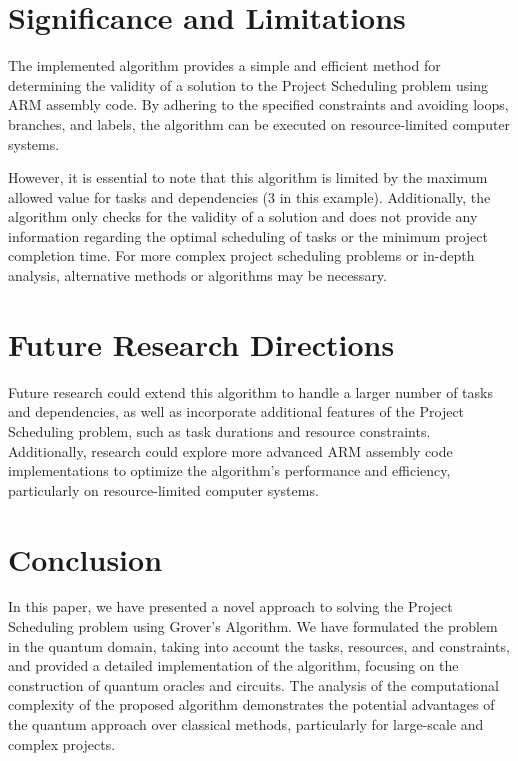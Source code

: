 \section{Significance and Limitations}

The implemented algorithm provides a simple and efficient method for determining the validity of a solution to the Project Scheduling problem using ARM assembly code. By adhering to the specified constraints and avoiding loops, branches, and labels, the algorithm can be executed on resource-limited computer systems.

However, it is essential to note that this algorithm is limited by the maximum allowed value for tasks and dependencies (3 in this example). Additionally, the algorithm only checks for the validity of a solution and does not provide any information regarding the optimal scheduling of tasks or the minimum project completion time. For more complex project scheduling problems or in-depth analysis, alternative methods or algorithms may be necessary.

\section{Future Research Directions}

Future research could extend this algorithm to handle a larger number of tasks and dependencies, as well as incorporate additional features of the Project Scheduling problem, such as task durations and resource constraints. Additionally, research could explore more advanced ARM assembly code implementations to optimize the algorithm's performance and efficiency, particularly on resource-limited computer systems.

\section{Conclusion}\label{sec:conclusion}

In this paper, we have presented a novel approach to solving the Project Scheduling problem using Grover's Algorithm. We have formulated the problem in the quantum domain, taking into account the tasks, resources, and constraints, and provided a detailed implementation of the algorithm, focusing on the construction of quantum oracles and circuits. The analysis of the computational complexity of the proposed algorithm demonstrates the potential advantages of the quantum approach over classical methods, particularly for large-scale and complex projects.


